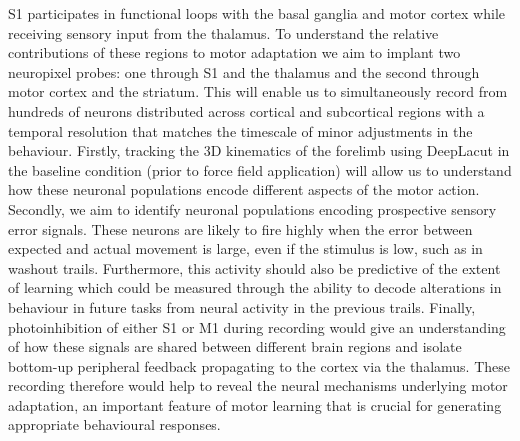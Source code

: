 \documentclass{article}
\begin{document}
S1 participates in functional loops with the basal ganglia and motor cortex while receiving sensory input from the thalamus. To understand the relative contributions of these regions to motor adaptation we aim to implant two neuropixel probes: one through S1 and the thalamus and the second through motor cortex and the striatum. This will enable us to simultaneously record from hundreds of neurons distributed across cortical and subcortical regions with a temporal resolution that matches the timescale of minor adjustments in the behaviour. Firstly, tracking the 3D kinematics of the forelimb using DeepLacut in the baseline condition (prior to force field application) will allow us to understand how these neuronal populations encode different aspects of the motor action. Secondly, we aim to identify neuronal populations encoding prospective sensory error signals.  These neurons are likely to fire highly when the error between expected and actual movement is large, even if the stimulus is low, such as in washout trails.  Furthermore, this activity should also be predictive of the extent of learning which could be measured through the ability to decode alterations in behaviour in future tasks from neural activity in the previous trails. Finally, photoinhibition of either S1 or M1 during recording would give an understanding of how these signals are shared between different brain regions and isolate bottom-up peripheral feedback propagating to the cortex via the thalamus. These recording therefore would help to reveal the neural mechanisms underlying motor adaptation, an important feature of motor learning that is crucial for generating appropriate behavioural responses.
\end{document}
